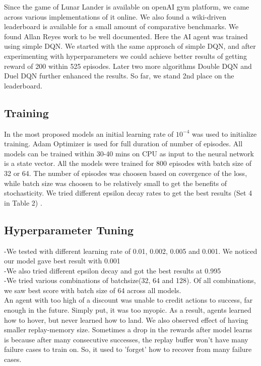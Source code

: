 Since the game of Lunar Lander is available on openAI gym platform, we came across various implementations of it online. We also found a wiki-driven leaderboard \citep{leaderboard} is available for a small amount of comparative benchmarks. We found Allan Reyes \citep{allanreyes} work to be well documented. Here the AI agent was trained using simple DQN. We started with the same approach of simple DQN, and after experimenting with hyperparameters we could achieve better results of getting reward of 200 within 525 episodes. Later two more algorithms Double DQN and Duel DQN further enhanced the results. So far, we stand 2nd place on the leaderboard.

\subsection{ Training}
In the most proposed models an initial learning rate of $10^{-4}$ was used to initialize training. Adam Optimizer is used for full duration of number of episodes. All models can be trained within 30-40 mins on CPU as input to the neural network is a state vector. All the models were trained for 800 episodes with batch size of 32 or 64. The number of episodes was choosen based on covergence of the loss, while batch size was choosen to be relatively small to get the benefits of stochasticity. We tried different epsilon decay rates to get the best results (Set 4 in Table 2) .




\subsection{ Hyperparameter  Tuning}
-We tested with different learning rate of 0.01, 0.002, 0.005 and 0.001. We noticed our model gave best result with 0.001\\
-We also tried different epsilon decay and got the best results at 0.995\\
-We tried various combinations of batchsize(32, 64 and 128). Of all combinations, we saw best score with batch size of 64 across all models. 
\\

An agent with too high of a discount was unable to credit actions to success, far enough in the future. Simply put, it was too myopic. As a result, agents learned how to hover, but never learned how to land. We also observed effect of having smaller replay-memory size. Sometimes a drop in the rewards after model learns is because after many consecutive successes, the replay buffer won't have many failure cases to train on. So, it used to 'forget' how to recover from many failure cases.
\\



